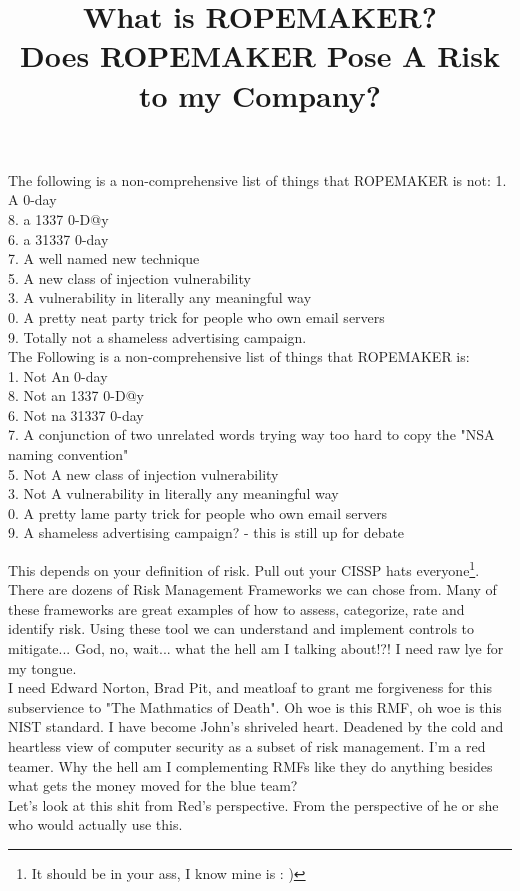 \documentclass[10pt,a4paper]{article}
\begin{document}
\begin{flushleft}
				\title{\huge{What is ROPEMAKER?\\}}
				\vspace{3 mm}
			{\normalsize
				\noindent The following is a non-comprehensive list of things that ROPEMAKER is not:
				1. A 0-day	\\
				8. a 1337 0-D@y\\
				6. a 31337 0-day\\
				7. A well named new technique\\
				5. A new class of injection vulnerability\\
				3. A vulnerability in literally any meaningful way\\
				0. A pretty neat party trick for people who own email servers\\
				9. Totally not a shameless advertising campaign.\\
				\vspace{3mm}
				\noindent The Following is a non-comprehensive list of things that ROPEMAKER is:\\
				1. Not An 0-day	\\
				8. Not an 1337 0-D@y\\
				6. Not na 31337 0-day\\
				7. A conjunction of two unrelated words trying way too hard to copy the "NSA naming convention"\\
				5. Not A new class of injection vulnerability\\
				3. Not A vulnerability in literally any meaningful way\\
				0. A pretty lame party trick for people who own email servers\\
				9. A shameless advertising campaign? - this is still up for debate\\}
			\vspace{7.5 mm}
			\title{\Huge{Does ROPEMAKER Pose A Risk to my Company?\\}}
			\vspace{5 mm}
			{\normalsize 
				This depends on your definition of risk. Pull out your CISSP hats everyone\footnote{It should be in your ass, I know mine is : )}. There are dozens of Risk Management Frameworks we can chose from. Many of these frameworks are great examples of how to assess, categorize, rate and identify risk. Using these tool we can understand and implement controls to mitigate... God, no, wait... what the hell am I talking about!?! I need raw lye for my tongue.\\
				\vspace{2.5 mm}
				I need Edward Norton, Brad Pit, and meatloaf to grant me forgiveness for this subservience to "The Mathmatics of Death". Oh woe is this RMF, oh woe is this NIST standard. I have become John's shriveled heart. Deadened by the cold and heartless view of computer security as a subset of risk management. I'm a red teamer. Why the hell am I complementing RMFs like they do anything besides what gets the money moved for the blue team?\\
				\vspace{2.5 mm}
				Let's look at this shit from Red's perspective. From the perspective of he or she who would actually use this.  
			}
			\pagebreak
			

\end{flushleft}
\end{document}
